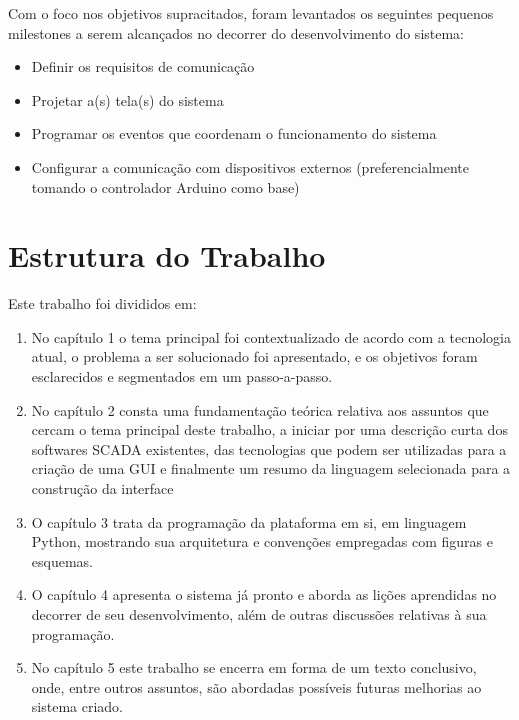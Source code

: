 Com o foco nos objetivos supracitados, foram levantados os seguintes pequenos milestones a serem alcançados no decorrer do desenvolvimento do sistema:

\begin{itemize}
	\item Definir os requisitos de comunicação
	\item Projetar a(s) tela(s) do sistema
	\item Programar os eventos que coordenam o funcionamento do sistema
	\item Configurar a comunicação com dispositivos externos (preferencialmente tomando o controlador Arduino como base)
\end{itemize}

\section{Estrutura do Trabalho}

Este trabalho foi divididos em:

\begin{enumerate}
	\item No capítulo 1 o tema principal foi contextualizado de acordo com a tecnologia atual, o problema a ser solucionado foi apresentado, e os objetivos foram esclarecidos e segmentados em um passo-a-passo.
	\item No capítulo 2 consta uma fundamentação teórica relativa aos assuntos que cercam o tema principal deste trabalho, a iniciar por uma descrição curta dos softwares SCADA existentes, das tecnologias que podem ser utilizadas para a criação de uma GUI e finalmente um resumo da linguagem selecionada para a construção da interface
	\item O capítulo 3 trata da programação da plataforma em si, em linguagem Python, mostrando sua arquitetura e convenções empregadas com figuras e esquemas.
	\item O capítulo 4 apresenta o sistema já pronto e aborda as lições aprendidas no decorrer de seu desenvolvimento, além de outras discussões relativas à sua programação.
	\item No capítulo 5 este trabalho se encerra em forma de um texto conclusivo, onde, entre outros assuntos, são abordadas possíveis futuras melhorias ao sistema criado.
\end{enumerate}